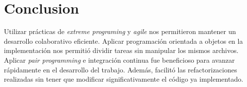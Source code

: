 \documentclass[titlepage,a4paper]{article}
\begin{document}
\section{Conclusion}
\label{sec:orgbe8bbfd}

Utilizar prácticas de \emph{extreme programing} y \emph{agile} nos permitieron
mantener un desarrollo colaborativo eficiente. Aplicar programación
orientada a objetos en la implementación nos permitió dividir tareas
sin manipular los mismos archivos. Aplicar \emph{pair programming} e
integración continua fue beneficioso para avanzar rápidamente en el
desarrollo del trabajo. Además, facilitó las refactorizaciones
realizadas sin tener que modificar significativamente el código ya
implementado.
\end{document}
